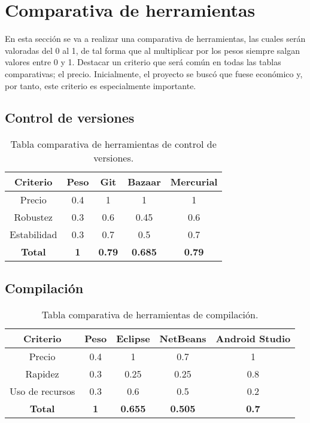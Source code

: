 \section{Comparativa de herramientas}

En esta sección se va a realizar una comparativa de herramientas, las cuales serán valoradas del 0 al 1, de tal forma que al multiplicar por los pesos siempre salgan valores entre 0 y 1. Destacar un criterio que será común en todas las tablas comparativas; el precio. Inicialmente, el proyecto se buscó que fuese económico y, por tanto, este criterio es especialmente importante.

\subsection{Control de versiones}

\begin{table}[H]
	\begin{center}
		\begin{tabular}{|c||c|c|c|c|}
			\hline
			Criterio & Peso & Git & Bazaar & Mercurial \\
			\hline \hline
			Precio & 0.4 & 1 & 1 & 1 \\ \hline
			Robustez & 0.3 & 0.6 & 0.45 & 0.6 \\ \hline
			Estabilidad & 0.3 & 0.7 & 0.5 & 0.7 \\ \hline
			\textbf{Total} & \textbf{1} & \textbf{0.79} & \textbf{0.685} & \textbf{0.79} \\ \hline
		\end{tabular}
		\caption{Tabla comparativa de herramientas de control de versiones.}
		\label{tabla:tabla1}
	\end{center}
\end{table}

\subsection{Compilación}

\begin{table}[H]
	\begin{center}
		\begin{tabular}{|c||c|c|c|c|}
			\hline
			Criterio & Peso & Eclipse & NetBeans & Android Studio \\
			\hline \hline
			Precio & 0.4 & 1 & 0.7 & 1 \\ \hline
			Rapidez & 0.3 & 0.25 & 0.25 & 0.8 \\ \hline
			Uso de recursos & 0.3 & 0.6 & 0.5 & 0.2 \\ \hline
			\textbf{Total} & \textbf{1} & \textbf{0.655} & \textbf{0.505} & \textbf{0.7} \\ \hline
		\end{tabular}
		\caption{Tabla comparativa de herramientas de compilación.}
		\label{tabla:tabla2}
	\end{center}
\end{table}

